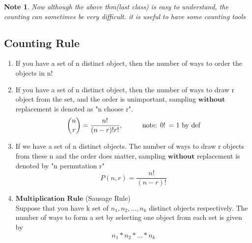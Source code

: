 \documentclass[11pt]{article}
\newtheorem*{note}{Note}
\newcommand\tab[1][1cm]{\hspace*{#1}}
\begin{document}
           \begin{note}
               Now although the above thm(last class) is easy to understand, the counting can sometimes be very difficult.
               it is useful to have some counting tools
           \end{note} 
        \subsection{Counting Rule}
            \begin{enumerate}
                \item If you have a set of n distinct object, then the number of ways to order the objects in n!
                \item If you have a set of n distinct object, then the number of ways to draw r object from the set, 
                     and the order is unimportant, sampling $\textbf{without}$ replacement is denoted as "n choose r". 
                     \[\binom{n}{r} = \frac{n!}{(n-r)!r!}, \tab \text{note: 0! = 1 by def}\]
                \item If we have a set of n distinct objects. The number of ways to draw r objects from these n and the order does matter, sampling 
                    $\textbf{without}$ replacement is denoted by "n permutation r" 
                    \[P(n,r) = \frac{n!}{(n-r)!}\]
                \item $\textbf{Multiplication Rule}$ (Sausage Rule)
                       \\Suppose that you have k set of $n_1, n_2, ... , n_k$ distinct objects respectively. 
                       The number of ways to form a set by selecting one object from each set is given by 
                       \[n_1*n_2*...*n_k\] 
            \end{enumerate}
        
\end{document}
